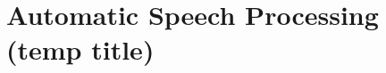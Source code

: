 \documentclass[12pt]{report}
\begin{document}
\newpage
\setlength{\parindent}{0.5cm}

 

\renewcommand{\contentsname}{Sommaire}
\tableofcontents
\clearpage

\listoffigures
\clearpage

\listoftables
\clearpage

\listofalgorithmes
\clearpage

\newpage    

\chapter{Automatic Speech Processing (temp title)}
    


\newpage
{} 
 

\end{document}
